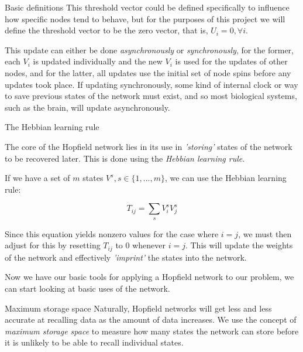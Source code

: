\documentclass[25pt, a0paper, portrait]{beamer}
\newlength{\colwidth}
\begin{document}
\begin{frame}[t]
\begin{columns}[t]
\begin{column}{\colwidth}
\begin{block}{Basic definitions}
    This threshold vector could be defined specifically to influence how specific nodes
    tend to behave, but for the purposes of this project we will define the threshold
    vector to be the zero vector, that is, $U_i = 0, \forall i$.

    This update can either be done \textit{asynchronously} or \textit{synchronously}, for the former,
    each $V_i$ is updated individually and the new $V_i$ is used for the updates
    of other nodes, and for the latter, all updates use the initial set of node spins
    before any updates took place. If updating synchronously, some kind of internal
    clock or way to save previous states of the network must exist, and so most 
    biological systems, such as the brain, will update asynchronously.
  \end{block}

  \begin{alertblock}{The Hebbian learning rule} \small

    The core of the Hopfield network lies in its use in \textit{'storing'} states
    of the network to be recovered later. This is done using the \textit{Hebbian learning
    rule}. \cite{hopfield:1982}

    If we have a set of $m$ states $V^s, s \in \{1, ..., m\}$, we can use the
    Hebbian learning rule:

    \begin{equation} \label{hebbian_learning_rule}
      T_{ij} = \sum_{s}{V^s_i}{V^s_j}
    \end{equation}

    Since this equation yields nonzero values for the case where $i = j$, we must
    then adjust for this by resetting $T_{ij}$ to $0$ whenever $i = j$. This will 
    update the weights of the network and effectively \textit{'imprint'}
    the states into the network.

    Now we have our basic tools for applying a Hopfield network to our problem, we
    can start looking at basic uses of the network.
  \end{alertblock}

  \begin{block}{Maximum storage space} \small
    Naturally, Hopfield networks will get less and less accurate at recalling data as
    the amount of data increases. We use the concept of \textit{maximum storage space}
    to measure how many states the network can store before it is unlikely to be able to
    recall individual states.


\end{block}
\end{column}
\end{columns}
\end{frame}
\end{document}
